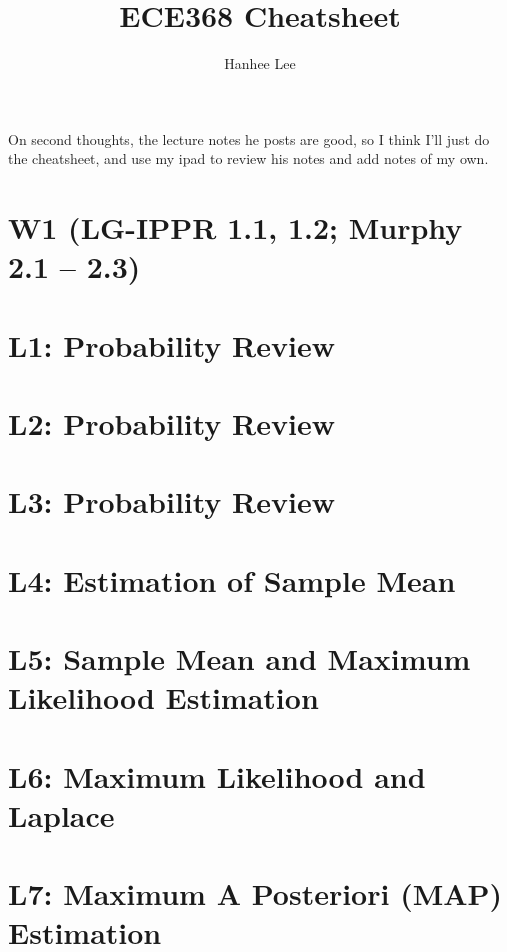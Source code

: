 \documentclass{article}
\title{ECE368 Cheatsheet}
\author{Hanhee Lee}
\begin{document}
\maketitle

\tableofcontents

\begin{summary}
    On second thoughts, the lecture notes he posts are good, so I think I'll just do the cheatsheet, and use my ipad to review his notes and add notes of my own.
\end{summary}
\section*{W1 (LG-IPPR 1.1, 1.2; Murphy 2.1 – 2.3)}
\section{L1: Probability Review}

\newpage

\section{L2: Probability Review}

\newpage

\section{L3: Probability Review}

\cleardoublepage

\section{L4: Estimation of Sample Mean}

\newpage

\section{L5: Sample Mean and Maximum Likelihood Estimation}

\newpage

\section{L6: Maximum Likelihood and Laplace}

\newpage

\section{L7: Maximum A Posteriori (MAP) Estimation} 

\newpage
\end{document}

